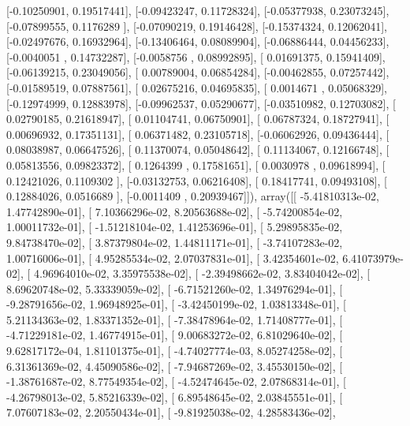 \documentclass{article}
\begin{document}
       [-0.10250901,  0.19517441],
       [-0.09423247,  0.11728324],
       [-0.05377938,  0.23073245],
       [-0.07899555,  0.1176289 ],
       [-0.07090219,  0.19146428],
       [-0.15374324,  0.12062041],
       [-0.02497676,  0.16932964],
       [-0.13406464,  0.08089904],
       [-0.06886444,  0.04456233],
       [-0.0040051 ,  0.14732287],
       [-0.0058756 ,  0.08992895],
       [ 0.01691375,  0.15941409],
       [-0.06139215,  0.23049056],
       [ 0.00789004,  0.06854284],
       [-0.00462855,  0.07257442],
       [-0.01589519,  0.07887561],
       [ 0.02675216,  0.04695835],
       [ 0.0014671 ,  0.05068329],
       [-0.12974999,  0.12883978],
       [-0.09962537,  0.05290677],
       [-0.03510982,  0.12703082],
       [ 0.02790185,  0.21618947],
       [ 0.01104741,  0.06750901],
       [ 0.06787324,  0.18727941],
       [ 0.00696932,  0.17351131],
       [ 0.06371482,  0.23105718],
       [-0.06062926,  0.09436444],
       [ 0.08038987,  0.06647526],
       [ 0.11370074,  0.05048642],
       [ 0.11134067,  0.12166748],
       [ 0.05813556,  0.09823372],
       [ 0.1264399 ,  0.17581651],
       [ 0.0030978 ,  0.09618994],
       [ 0.12421026,  0.1109302 ],
       [-0.03132753,  0.06216408],
       [ 0.18417741,  0.09493108],
       [ 0.12884026,  0.0516689 ],
       [-0.0011409 ,  0.20939467]]), array([[ -5.41810313e-02,   1.47742890e-01],
       [  7.10366296e-02,   8.20563688e-02],
       [ -5.74200854e-02,   1.00011732e-01],
       [ -1.51218104e-02,   1.41253696e-01],
       [  5.29895835e-02,   9.84738470e-02],
       [  3.87379804e-02,   1.44811171e-01],
       [ -3.74107283e-02,   1.00716006e-01],
       [  4.95285534e-02,   2.07037831e-01],
       [  3.42354601e-02,   6.41073979e-02],
       [  4.96964010e-02,   3.35975538e-02],
       [ -2.39498662e-02,   3.83404042e-02],
       [  8.69620748e-02,   5.33339059e-02],
       [ -6.71521260e-02,   1.34976294e-01],
       [ -9.28791656e-02,   1.96948925e-01],
       [ -3.42450199e-02,   1.03813348e-01],
       [  5.21134363e-02,   1.83371352e-01],
       [ -7.38478964e-02,   1.71408777e-01],
       [ -4.71229181e-02,   1.46774915e-01],
       [  9.00683272e-02,   6.81029640e-02],
       [  9.62817172e-04,   1.81101375e-01],
       [ -4.74027774e-03,   8.05274258e-02],
       [  6.31361369e-02,   4.45090586e-02],
       [ -7.94687269e-02,   3.45530150e-02],
       [ -1.38761687e-02,   8.77549354e-02],
       [ -4.52474645e-02,   2.07868314e-01],
       [ -4.26798013e-02,   5.85216339e-02],
       [  6.89548645e-02,   2.03845551e-01],
       [  7.07607183e-02,   2.20550434e-01],
       [ -9.81925038e-02,   4.28583436e-02],
\end{document}
